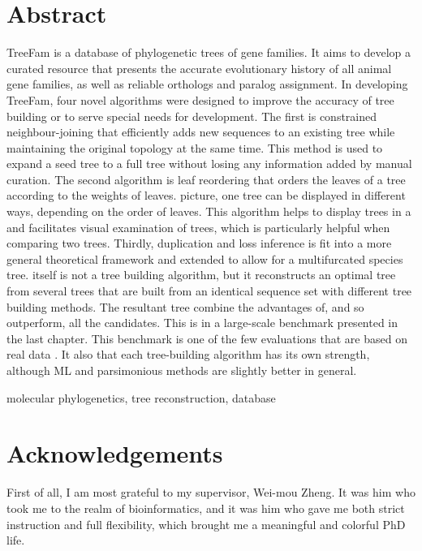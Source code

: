 \chapter*{Abstract}
TreeFam is a database of phylogenetic trees of gene families. It aims
to develop a curated resource that presents the accurate evolutionary
history of all animal gene families, as well as reliable orthologs and
paralog assignment.
In developing TreeFam, four novel algorithms
were designed to improve the accuracy of tree building or to serve
special needs for development. The first is  constrained neighbour-joining
that efficiently adds new sequences to an existing tree while maintaining
the original topology at the same time. This method is used to expand
a seed tree to a full tree without losing any information added by
manual curation. The second algorithm is  leaf reordering that
orders the leaves of a tree according to the weights of leaves.
 picture, one tree can be displayed in different
ways, depending on the order of leaves. This algorithm helps to
display trees in a  and facilitates
visual examination of trees, which is particularly helpful when
comparing two trees. Thirdly, duplication and loss inference
is fit into a more general theoretical framework and extended to allow for
a multifurcated species tree. 
 itself is not a tree building algorithm, but it
reconstructs an optimal tree from several trees
that are built from an identical sequence set with different tree building
methods. The resultant tree  combine the advantages
of, and so outperform, all the candidates. This is 
in a large-scale benchmark presented in the last chapter.
This benchmark is one of the few evaluations that are based on real data
.
It also  that each tree-building algorithm has its own strength,
although ML and parsimonious methods are slightly better in general.

{ molecular phylogenetics, tree reconstruction, database}

\chapter*{Acknowledgements}
First of all, I am most grateful to my supervisor, Wei-mou Zheng. It was him who
took me to the realm of bioinformatics, and it was him who gave me both strict instruction and full flexibility,
which brought me a meaningful and colorful PhD life.

